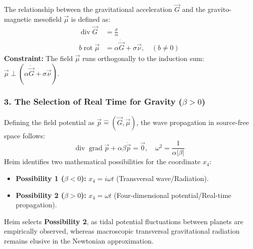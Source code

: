\documentclass[11pt,a4paper,oneside]{article}
\begin{document}
\begin{tcolorbox}[colback=white, colframe=theoryblue, title=\textbf{The Dynamic Gravitation Law}]
The relationship between the gravitational acceleration $\vec{G}$ and the gravito-magnetic mesofield $\vec{\mu}$ is defined as:
\begin{align}
    \operatorname{div} \vec{G} &= \frac{\sigma}{\alpha} \\
    b \operatorname{rot} \vec{\mu} &= \alpha \dot{\vec{G}} + \sigma \vec{\nu}, \quad (b \neq 0)
\end{align}
\textbf{Constraint:} The field $\vec{\mu}$ runs orthogonally to the induction sum: $\vec{\mu} \perp (\alpha \dot{\vec{G}} + \sigma \vec{\nu})$.
\end{tcolorbox}

\subsubsection*{3. The Selection of Real Time for Gravity ($\beta > 0$)}
Defining the field potential as $\vec{p} \hat{=} (\vec{G}, \vec{\mu})$, the wave propagation in source-free space follows:
\begin{equation}
    \operatorname{div} \operatorname{grad} \vec{p} + \alpha \beta \ddot{\vec{p}} = \vec{0}, \quad \omega^2 = \frac{1}{\alpha |\beta|}
\end{equation}
Heim identifies two mathematical possibilities for the coordinate $x_4$:
\begin{itemize}
    \item \textbf{Possibility 1 ($\beta < 0$):} $x_4 = i \omega t$ (Transversal wave/Radiation).
    \item \textbf{Possibility 2 ($\beta > 0$):} $x_4 = \omega t$ (Four-dimensional potential/Real-time propagation).
\end{itemize}
Heim selects \textbf{Possibility 2}, as tidal potential fluctuations between planets are empirically observed, whereas macroscopic transversal gravitational radiation remains elusive in the Newtonian approximation.
\end{document}
